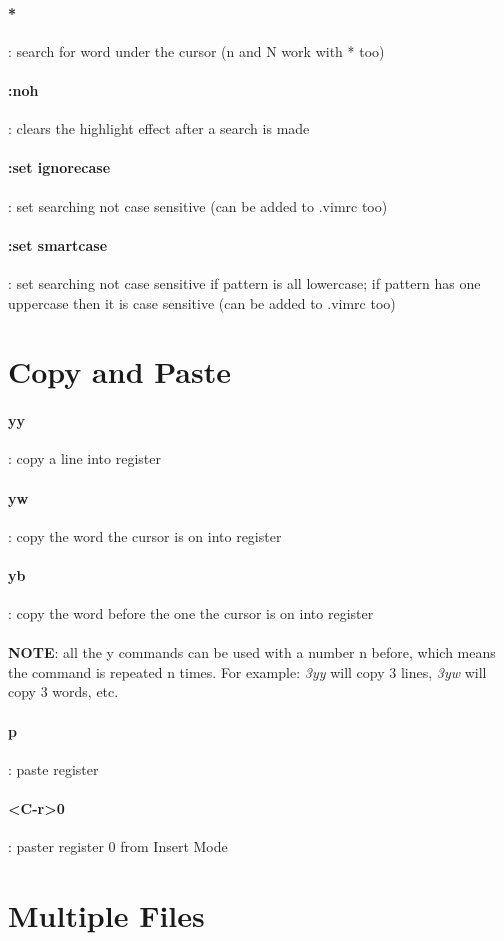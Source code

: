 \documentclass[10pt,letterpaper]{book}
\begin{document}
\paragraph{*}: search for word under the cursor (n and N work with * too)
\paragraph{:noh}: clears the highlight effect after a search is made
\paragraph{:set ignorecase}: set searching not case sensitive (can be added to .vimrc too)
\paragraph{:set smartcase}: set searching not case sensitive if pattern is all lowercase; if pattern has one uppercase then it is case sensitive (can be added to .vimrc too) 
\section{Copy and Paste}
\paragraph{yy}: copy a line into register
\paragraph{yw}: copy the word the cursor is on into register
\paragraph{yb}: copy the word before the one the cursor is on into register\\ \\
\textbf{NOTE}: all the y commands can be used with a number n before, which means the command is repeated n times. For example: \textit{3yy} will copy 3 lines, \textit{3yw} will copy 3 words, etc.
\paragraph{p}: paste register
\paragraph{<C-r>0}: paster register 0 from Insert Mode
\section{Multiple Files}
\end{document}

